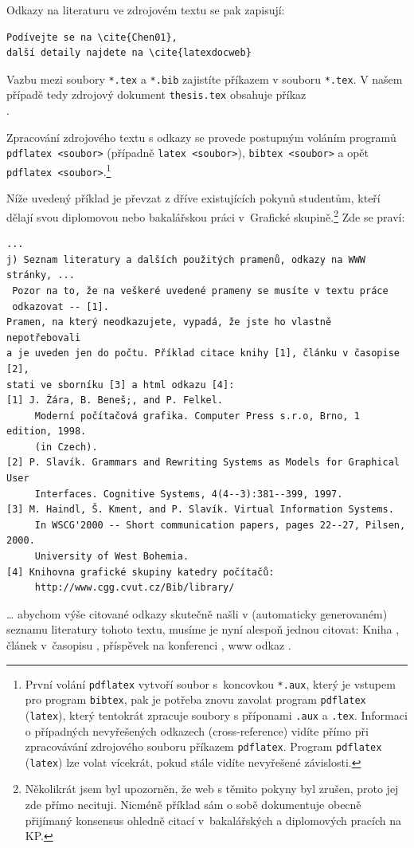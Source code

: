 \documentclass[11pt,twoside,a4paper]{book}
\begin{document}
Odkazy na literaturu ve zdrojovém textu se pak zapisují:
\begin{verbatim}
Podívejte se na \cite{Chen01}, 
další detaily najdete na \cite{latexdocweb}
\end{verbatim}

Vazbu mezi soubory \verb|*.tex| a \verb|*.bib| zajistíte příkazem 
\verb|| v souboru \verb|*.tex|.  V našem případě tedy zdrojový 
dokument \verb|thesis.tex| obsahuje příkaz\\
\verb||.

Zpracování zdrojového textu s odkazy se provede postupným voláním programů\\
\verb|pdflatex <soubor>| (případně \verb|latex <soubor>|), \verb|bibtex <soubor>| 
a opět\\ \verb|pdflatex <soubor>|.\footnote{První volání \texttt{pdflatex} 
vytvoří soubor s~koncovkou \texttt{*.aux}, který je vstupem pro program 
\texttt{bibtex}, pak je potřeba znovu zavolat program \texttt{pdflatex} 
(\texttt{latex}), který tentokrát zpracuje soubory s příponami \texttt{.aux} a 
\texttt{.tex}. 
Informaci o případných nevyřešených odkazech (cross-reference) vidíte přímo při 
zpracovávání zdrojového souboru příkazem \texttt{pdflatex}. Program \texttt{pdflatex} 
(\texttt{latex}) lze volat vícekrát, pokud stále vidíte nevyřešené závislosti.}


Níže uvedený příklad je převzat z dříve existujících pokynů studentům, kteří 
dělají svou diplomovou nebo bakalářskou práci v~Grafické skupině.\footnote{Několikrát 
jsem byl upozorněn, že web s těmito pokyny byl zrušen, proto jej zde přímo necituji. 
Nicméně příklad sám o sobě dokumentuje obecně přijímaný konsensus ohledně citací 
v~bakalářských a diplomových pracích na KP.} Zde se praví:
\begin{small}
\begin{verbatim}
...
j) Seznam literatury a dalších použitých pramenů, odkazy na WWW stránky, ...
 Pozor na to, že na veškeré uvedené prameny se musíte v textu práce 
 odkazovat -- [1]. 
Pramen, na který neodkazujete, vypadá, že jste ho vlastně nepotřebovali 
a je uveden jen do počtu. Příklad citace knihy [1], článku v časopise [2], 
stati ve sborníku [3] a html odkazu [4]: 
[1] J. Žára, B. Beneš;, and P. Felkel. 
     Moderní počítačová grafika. Computer Press s.r.o, Brno, 1 edition, 1998. 
     (in Czech). 
[2] P. Slavík. Grammars and Rewriting Systems as Models for Graphical User 
     Interfaces. Cognitive Systems, 4(4--3):381--399, 1997. 
[3] M. Haindl, Š. Kment, and P. Slavík. Virtual Information Systems. 
     In WSCG'2000 -- Short communication papers, pages 22--27, Pilsen, 2000. 
     University of West Bohemia. 
[4] Knihovna grafické skupiny katedry počítačů: 
     http://www.cgg.cvut.cz/Bib/library/ 
\end{verbatim}
\end{small}
\ldots{} abychom výše citované odkazy skutečně našli v (automaticky generovaném) seznamu literatury tohoto textu, musíme je nyní alespoň jednou citovat: Kniha \cite{kniha}, článek v~časopisu \cite{clanek}, příspěvek na konferenci \cite{sbornik}, www odkaz \cite{www}.
\end{document}
